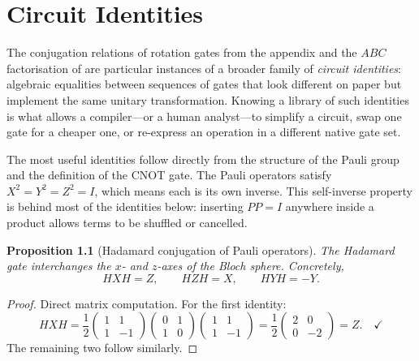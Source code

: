 \documentclass[12pt, a4paper, oneside]{report}
\theoremstyle{plain}
\newtheorem{proposition}[theorem]{Proposition}
\theoremstyle{definition}
\theoremstyle{remark}
\begin{document}

\chapter{Circuit Identities}
\label{sec:rotation-conjugation}

The conjugation relations of rotation gates from the appendix and the $ABC$ factorisation
of  are particular instances of a broader family of \emph{circuit identities}:
algebraic equalities between sequences of gates that look different on paper but implement
the same unitary transformation. Knowing a library of such identities is what allows a
compiler---or a human analyst---to simplify a circuit, swap one gate for a cheaper one, or
re-express an operation in a different native gate set.

The most useful identities follow directly from the structure of the Pauli group and the
definition of the CNOT gate. The Pauli operators satisfy $X^2 = Y^2 = Z^2 = I$, which means
each is its own inverse. This self-inverse property is behind most of the identities below:
inserting $PP = I$ anywhere inside a product allows terms to be shuffled or cancelled.

\begin{proposition}[Hadamard conjugation of Pauli operators]
	\label{prop:h-conj-pauli}
	The Hadamard gate interchanges the $x$- and $z$-axes of the Bloch sphere. Concretely,
	\[
		HXH = Z, \qquad HZH = X, \qquad HYH = -Y.
	\]
\end{proposition}

\begin{proof}
	Direct matrix computation. For the first identity:
	\[
		HXH
		= \frac{1}{2}\begin{pmatrix}1&1\\1&-1\end{pmatrix}
		\begin{pmatrix}0&1\\1&0\end{pmatrix}
		\begin{pmatrix}1&1\\1&-1\end{pmatrix}
		= \frac{1}{2}\begin{pmatrix}2&0\\0&-2\end{pmatrix}
		= Z. \quad\checkmark
	\]
	The remaining two follow similarly.
\end{proof}
\end{document}
